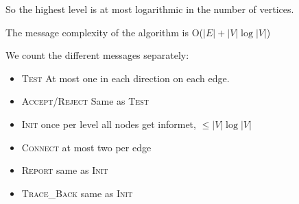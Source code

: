 So the highest level is at most logarithmic in the number of vertices.

\begin{lem} The message complexity of the algorithm is O($|E|+|V|\log |V|$)\end{lem}
\begin{pr} We count the different messages separately:
\begin{itemize}
\item {\scshape Test} At most one in each direction on each edge.
\item {\scshape Accept/Reject} Same as {\scshape Test}
\item {\scshape Init} once per level all nodes get informet, $\leq |V|\log |V|$
\item {\scshape Connect} at most two per edge
\item {\scshape Report} same as {\scshape Init}
\item {\scshape Trace\_Back} same as {\scshape Init}
\end{itemize}
\end{pr}